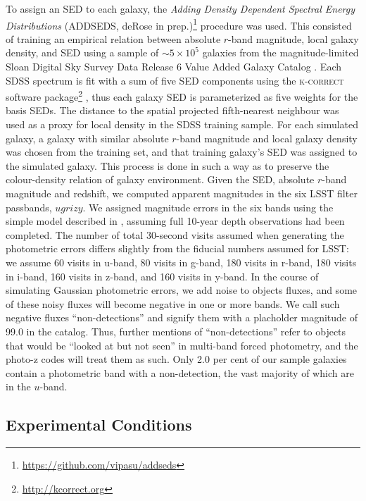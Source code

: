 To assign an SED to each galaxy, the {\it Adding Density Dependent Spectral Energy Distributions} (\textsc{ADDSEDS}, deRose in prep.)\footnote{\url{https://github.com/vipasu/addseds}} procedure was used.
This consisted of training an empirical relation between absolute $r$-band magnitude, local galaxy density, and SED using a sample of $\sim 5\times 10^{5}$ galaxies from the magnitude-limited Sloan Digital Sky Survey Data Release 6 Value Added Galaxy Catalog \citep{Blanton:05}.
Each SDSS spectrum is fit with a sum of five SED components using the \textsc{k-correct } software package\footnote{\url{http://kcorrect.org}} \citep{Blanton:07}, thus each galaxy SED is parameterized as five weights for the basis SEDs.
The distance to the spatial projected fifth-nearest neighbour was used as a proxy for local density in the SDSS training sample.
For each simulated galaxy, a galaxy with similar absolute $r$-band magnitude and local galaxy density was chosen from the training set, and that training galaxy's SED was assigned to the simulated galaxy.
This process is done in such a way as to preserve the colour-density relation of galaxy environment.
Given the SED, absolute $r$-band magnitude and redshift, we computed apparent magnitudes in the six LSST filter passbands, $ugrizy$.
We assigned magnitude errors in the six bands using the simple model described in \citet{Ivezic:08}, assuming full 10-year depth observations had been completed.
The number of total 30-second visits assumed when generating the photometric errors differs slightly from the fiducial numbers assumed for LSST: we assume 60 visits in u-band, 80 visits in g-band, 180 visits in r-band, 180 visits in i-band, 160 visits in z-band, and 160 visits in y-band.
In the course of simulating Gaussian photometric errors, we add noise to objects fluxes, and some of these noisy fluxes will become negative in one or more bands.
We call such negative fluxes ``non-detections'' and signify them with a placholder magnitude of 99.0 in the catalog.
Thus, further mentions of ``non-detections'' refer to objects that would be ``looked at but not seen'' in multi-band forced photometry, and the photo-z codes will treat them as such.
Only 2.0 per cent of our sample galaxies contain a photometric band with a non-detection, the vast majority of which are in the $u$-band.

\subsection{Experimental Conditions}
\label{sec:controlled}

